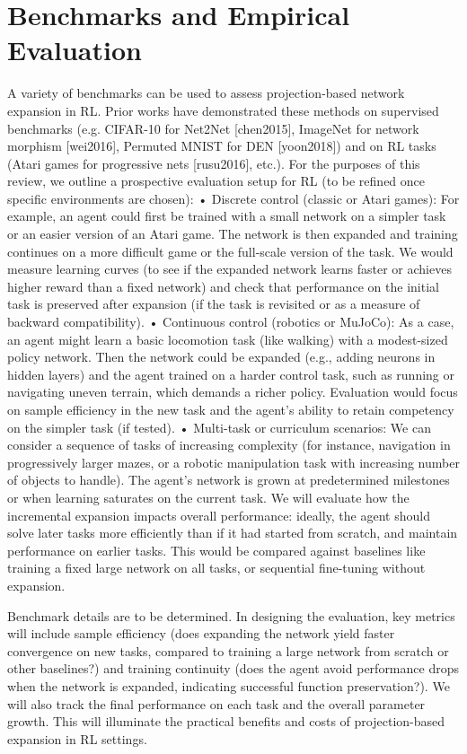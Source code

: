 \section{Benchmarks and Empirical Evaluation}
A variety of benchmarks can be used to assess projection-based network expansion in RL. Prior works have demonstrated these methods on supervised benchmarks (e.g. CIFAR-10 for Net2Net [chen2015], ImageNet for network morphism [wei2016], Permuted MNIST for DEN [yoon2018]) and on RL tasks (Atari games for progressive nets [rusu2016], etc.). For the purposes of this review, we outline a prospective evaluation setup for RL (to be refined once specific environments are chosen):
	•	Discrete control (classic or Atari games): For example, an agent could first be trained with a small network on a simpler task or an easier version of an Atari game. The network is then expanded and training continues on a more difficult game or the full-scale version of the task. We would measure learning curves (to see if the expanded network learns faster or achieves higher reward than a fixed network) and check that performance on the initial task is preserved after expansion (if the task is revisited or as a measure of backward compatibility).
	•	Continuous control (robotics or MuJoCo): As a case, an agent might learn a basic locomotion task (like walking) with a modest-sized policy network. Then the network could be expanded (e.g., adding neurons in hidden layers) and the agent trained on a harder control task, such as running or navigating uneven terrain, which demands a richer policy. Evaluation would focus on sample efficiency in the new task and the agent’s ability to retain competency on the simpler task (if tested).
	•	Multi-task or curriculum scenarios: We can consider a sequence of tasks of increasing complexity (for instance, navigation in progressively larger mazes, or a robotic manipulation task with increasing number of objects to handle). The agent’s network is grown at predetermined milestones or when learning saturates on the current task. We will evaluate how the incremental expansion impacts overall performance: ideally, the agent should solve later tasks more efficiently than if it had started from scratch, and maintain performance on earlier tasks. This would be compared against baselines like training a fixed large network on all tasks, or sequential fine-tuning without expansion.

Benchmark details are to be determined. In designing the evaluation, key metrics will include sample efficiency (does expanding the network yield faster convergence on new tasks, compared to training a large network from scratch or other baselines?) and training continuity (does the agent avoid performance drops when the network is expanded, indicating successful function preservation?). We will also track the final performance on each task and the overall parameter growth. This will illuminate the practical benefits and costs of projection-based expansion in RL settings.


